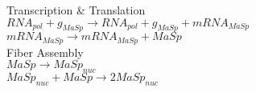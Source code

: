 \documentclass[11pt, oneside]{article}   	%
\begin{document}
\begin{center}

Transcription \& Translation \\
$RNA_{pol} + g_{MaSp} \rightarrow RNA_{pol} + g_{MaSp} + mRNA_{MaSp}$ \\
$mRNA_{MaSp} \rightarrow mRNA_{MaSp} + MaSp$ \\
\hfill \break
Fiber Assembly \\
$MaSp \rightarrow MaSp_{nuc}$ \\
$MaSp_{nuc} + MaSp \rightarrow 2 MaSp_{nuc}$ \\



\end{center}
\end{document}
